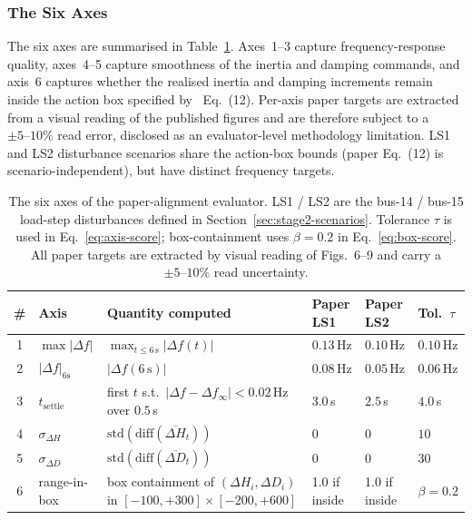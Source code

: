 \documentclass{unnc-fyp}
\begin{document}
\subsubsection{The Six Axes}

The six axes are summarised in Table~\ref{tab:six-axes}.
Axes~1--3 capture frequency-response quality, axes~4--5 capture
smoothness of the inertia and damping commands, and axis~6
captures whether the realised inertia and damping increments
remain inside the action box specified by~\cite{yang2023ddic}
Eq.~(12).
Per-axis paper targets are extracted from a visual reading of the
published figures and are therefore subject to a $\pm 5\text{--}10\%$
read error, disclosed as an evaluator-level methodology limitation.
LS1 and LS2 disturbance scenarios share the action-box bounds (paper
Eq.~(12) is scenario-independent), but have distinct frequency
targets.

\begin{table}[tb]
  \centering
  \small
  \caption{The six axes of the paper-alignment evaluator. LS1 / LS2
           are the bus-14 / bus-15 load-step disturbances defined in
           Section~\ref{sec:stage2-scenarios}. Tolerance $\tau$ is
           used in Eq.~\eqref{eq:axis-score}; box-containment uses
           $\beta = 0.2$ in Eq.~\eqref{eq:box-score}. All paper
           targets are extracted by visual reading of
           \cite{yang2023ddic} Figs.~6--9 and carry a
           $\pm 5\text{--}10\%$ read uncertainty.}
  \label{tab:six-axes}
  \begin{tabular}{@{}clllll@{}}
    \toprule
    \# & Axis & Quantity computed & Paper LS1 & Paper LS2 & Tol.\ $\tau$ \\
    \midrule
    1 & $\max|\Delta f|$           & $\max_{t \le 6\,\mathrm{s}}|\Delta f(t)|$
      & $0.13$\,Hz & $0.10$\,Hz & $0.10$\,Hz \\
    2 & $|\Delta f|_{6\mathrm{s}}$ & $|\Delta f(6\,\mathrm{s})|$
      & $0.08$\,Hz & $0.05$\,Hz & $0.06$\,Hz \\
    3 & $t_\mathrm{settle}$        & first $t$ s.t.\ $|\Delta f - \Delta f_\infty| < 0.02$\,Hz over $0.5$\,s
      & $3.0$\,s   & $2.5$\,s   & $4.0$\,s \\
    4 & $\sigma_{\Delta H}$        & $\mathrm{std}(\mathrm{diff}(\overline{\Delta H}_t))$
      & $0$        & $0$        & $10$ \\
    5 & $\sigma_{\Delta D}$        & $\mathrm{std}(\mathrm{diff}(\overline{\Delta D}_t))$
      & $0$        & $0$        & $30$ \\
    6 & range-in-box               & box containment of
      $(\Delta H_i, \Delta D_i)$ in $[-100, +300] \times [-200, +600]$
      & 1.0 if inside & 1.0 if inside & $\beta = 0.2$ \\
    \bottomrule
  \end{tabular}
\end{table}
\end{document}
